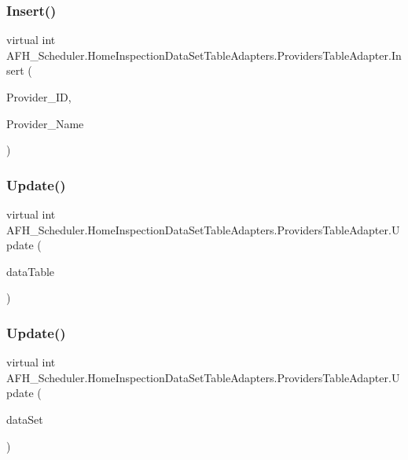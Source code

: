 \subsubsection{Insert()}
{\footnotesize\ttfamily virtual int A\+F\+H\+\_\+\+Scheduler.\+Home\+Inspection\+Data\+Set\+Table\+Adapters.\+Providers\+Table\+Adapter.\+Insert (\begin{DoxyParamCaption}\item[{long}]{Provider\+\_\+\+ID,  }\item[{string}]{Provider\+\_\+\+Name }\end{DoxyParamCaption})\hspace{0.3cm}{\ttfamily [virtual]}}

\mbox{\label{class_a_f_h___scheduler_1_1_home_inspection_data_set_table_adapters_1_1_providers_table_adapter_a5c0a17c73d0325840a2fe51e9cb7bcc0}} 
\subsubsection{Update()\hspace{0.1cm}{\footnotesize\ttfamily [1/6]}}
{\footnotesize\ttfamily virtual int A\+F\+H\+\_\+\+Scheduler.\+Home\+Inspection\+Data\+Set\+Table\+Adapters.\+Providers\+Table\+Adapter.\+Update (\begin{DoxyParamCaption}\item[{\textbf{ Home\+Inspection\+Data\+Set.\+Providers\+Data\+Table}}]{data\+Table }\end{DoxyParamCaption})\hspace{0.3cm}{\ttfamily [virtual]}}

\mbox{\label{class_a_f_h___scheduler_1_1_home_inspection_data_set_table_adapters_1_1_providers_table_adapter_aa90d6d8334f247b26bc364e035e8ef66}} 
\subsubsection{Update()\hspace{0.1cm}{\footnotesize\ttfamily [2/6]}}
{\footnotesize\ttfamily virtual int A\+F\+H\+\_\+\+Scheduler.\+Home\+Inspection\+Data\+Set\+Table\+Adapters.\+Providers\+Table\+Adapter.\+Update (\begin{DoxyParamCaption}\item[{\textbf{ Home\+Inspection\+Data\+Set}}]{data\+Set }\end{DoxyParamCaption})\hspace{0.3cm}{\ttfamily [virtual]}}

